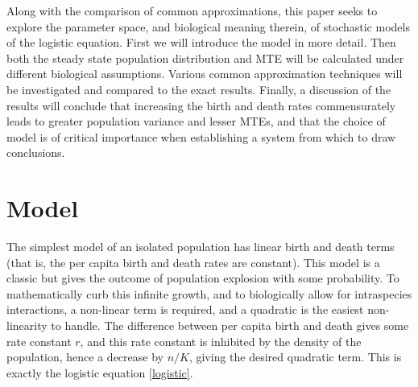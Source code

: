 \documentclass[a4paper,10pt]{article}
\numberwithin{equation}{section} %
\begin{document}
Along with the comparison of common approximations, this paper seeks to explore the parameter space, and biological meaning therein, of stochastic models of the logistic equation. %
First we will introduce the model in more detail. 
Then both the steady state population distribution and MTE will be calculated under different biological assumptions. 
Various common approximation techniques will be investigated and compared to the exact results. 
Finally, a discussion of the results will conclude that increasing the birth and death rates commensurately leads to greater population variance and lesser MTEs, and that the choice of model is of critical importance when establishing a system from which to draw conclusions. 













\section{Model}%

The simplest model of an isolated population has linear birth and death terms (that is, the per capita birth and death rates are constant). 
This model is a classic but gives the outcome of population explosion with some probability\cite{Nisbet1982}. %
To mathematically curb this infinite growth, and to biologically allow for intraspecies interactions, a non-linear term is required, and a quadratic is the easiest non-linearity to handle. 
The difference between per capita birth and death gives some rate constant $r$, and this rate constant is inhibited by the density of the population, hence a decrease by $n/K$, giving the desired quadratic term. 
This is exactly the logistic equation \ref{logistic}. 
\end{document}
